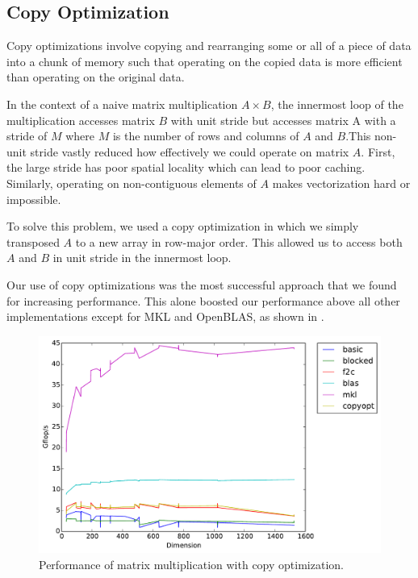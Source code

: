 \subsection{Copy Optimization}
Copy optimizations involve copying and rearranging some or all of a piece of
data into a chunk of memory such that operating on the copied data is more
efficient than operating on the original data.

In the context of a naive matrix multiplication $A \times B$, the innermost
loop of the multiplication accesses matrix $B$ with unit stride but accesses
matrix A with a stride of $M$ where $M$ is the number of rows and columns of
$A$ and $B$.This non-unit stride vastly reduced how effectively we could
operate on matrix $A$. First, the large stride has poor spatial locality which
can lead to poor caching. Similarly, operating on non-contiguous elements of
$A$ makes vectorization hard or impossible.

To solve this problem, we used a copy optimization in which we simply
transposed $A$ to a new array in row-major order. This allowed us to access
both $A$ and $B$ in unit stride in the innermost loop.

Our use of copy optimizations was the most successful approach that we found
for increasing performance. This alone boosted our performance above all other
implementations except for MKL and OpenBLAS, as shown in .

\begin{figure}[h]
  \centering
  \includegraphics[width=\textwidth]{timing_copyopt.pdf}
  \caption{Performance of matrix multiplication with copy optimization.}
  \label{fig:copy}
\end{figure}
